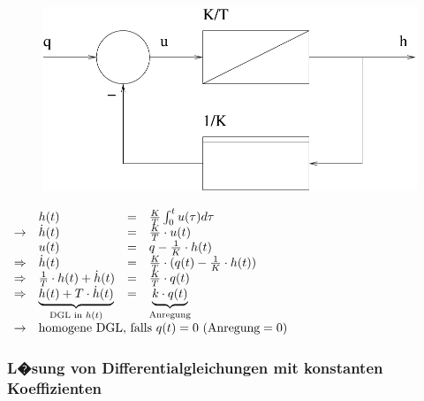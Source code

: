 \documentclass[12pt,a4paper,ngerman]{scrartcl}
\begin{document}
   \begin{figure}[H]
     \centering
     \includegraphics[width=.5\linewidth]{sysregel_bsb6}
   \end{figure}
   \begin{math}
     \begin{array}{llll}
       &h(t)&=&\frac{K}{T}\int_0^t{u(\tau)d\tau}\\
     \rightarrow&\dot{h}(t)&=&\frac{K}{T}\cdot u(t)\\
     &u(t)&=&q-\frac{1}{K}\cdot h(t)\\
     \Rightarrow&\dot{h}(t)&=&\frac{K}{T}\cdot (q(t)-\frac{1}{K} \cdot{h}(t))\\
     \Rightarrow&\frac{1}{T}\cdot h(t)+\dot{h}(t)&=&\frac{K}{T}\cdot q(t)\\
     \Rightarrow&\underbrace{h(t)+T\cdot \dot{h}(t)}_{\text{DGL in }h(t)}&=&\underbrace{k\cdot q(t)}_{\text{Anregung}}\\

     \rightarrow& \multicolumn{3}{l}{\text{homogene DGL, falls }q(t)=0 \text{ (Anregung}=0)}
   \end{array}
  \end{math}

  \subsubsection{L�sung von Differentialgleichungen mit konstanten Koeffizienten}
\end{document}
